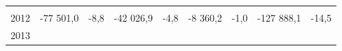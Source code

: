 \begin{longtable}[]{@{}lllllllll@{}}
\begin{minipage}[t]{0.12\columnwidth}
\strut
\end{minipage} & \begin{minipage}[t]{0.06\columnwidth}\raggedright
\strut
\end{minipage} & \begin{minipage}[t]{0.09\columnwidth}\raggedright
\strut
\end{minipage} & \begin{minipage}[t]{0.06\columnwidth}\raggedright
\strut
\end{minipage}\tabularnewline
\begin{minipage}[t]{0.05\columnwidth}\raggedright
2012\strut
\end{minipage} & \begin{minipage}[t]{0.10\columnwidth}\raggedright
-77 501,0\strut
\end{minipage} & \begin{minipage}[t]{0.06\columnwidth}\raggedright
-8,8\strut
\end{minipage} & \begin{minipage}[t]{0.16\columnwidth}\raggedright
-42 026,9\strut
\end{minipage} & \begin{minipage}[t]{0.06\columnwidth}\raggedright
-4,8\strut
\end{minipage} & \begin{minipage}[t]{0.12\columnwidth}\raggedright
-8 360,2\strut
\end{minipage} & \begin{minipage}[t]{0.06\columnwidth}\raggedright
-1,0\strut
\end{minipage} & \begin{minipage}[t]{0.09\columnwidth}\raggedright
-127 888,1\strut
\end{minipage} & \begin{minipage}[t]{0.06\columnwidth}\raggedright
-14,5\strut
\end{minipage}\tabularnewline
\begin{minipage}[t]{0.05\columnwidth}\raggedright
2013\strut
\end{minipage} & \begin{minipage}[t]{0.10\columnwidth}\raggedright
\strut
\end{minipage} & \begin{minipage}[t]{0.06\columnwidth}\raggedright
\strut
\end{minipage} & \begin{minipage}[t]{0.16\columnwidth}\raggedright
\strut
\end{minipage} & \begin{minipage}[t]{0.06\columnwidth}\raggedright

\end{minipage}
\end{longtable}
